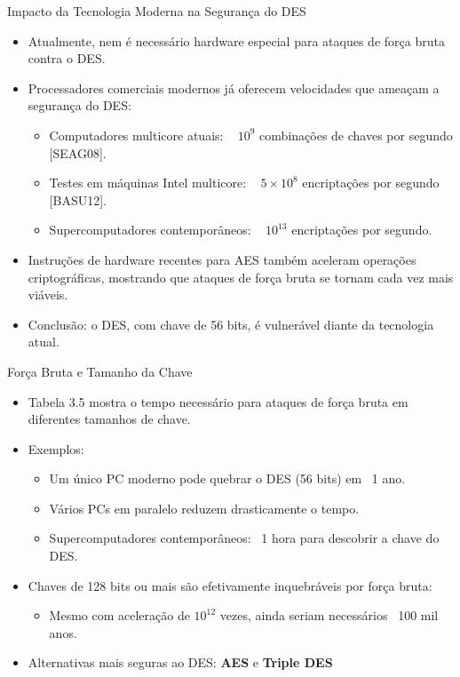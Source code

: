\begin{frame}{Impacto da Tecnologia Moderna na Segurança do DES}
    \begin{itemize}
        \item Atualmente, nem é necessário hardware especial para ataques de força bruta contra o DES.
        \item Processadores comerciais modernos já oferecem velocidades que ameaçam a segurança do DES:
        \begin{itemize}
            \item Computadores multicore atuais: ~ $10^9$ combinações de chaves por segundo [SEAG08].
            \item Testes em máquinas Intel multicore: ~ $5 \times 10^8$ encriptações por segundo [BASU12].
            \item Supercomputadores contemporâneos: ~ $10^{13}$ encriptações por segundo.
        \end{itemize}
        \item Instruções de hardware recentes para AES também aceleram operações criptográficas, mostrando que ataques de força bruta se tornam cada vez mais viáveis.
        \item Conclusão: o DES, com chave de 56 bits, é vulnerável diante da tecnologia atual.
    \end{itemize}
\end{frame}

\begin{frame}{Força Bruta e Tamanho da Chave}
    \begin{itemize}
        \item Tabela 3.5 mostra o tempo necessário para ataques de força bruta em diferentes tamanhos de chave.
        \item Exemplos:
        \begin{itemize}
            \item Um único PC moderno pode quebrar o DES (56 bits) em ~1 ano.
            \item Vários PCs em paralelo reduzem drasticamente o tempo.
            \item Supercomputadores contemporâneos: ~1 hora para descobrir a chave do DES.
        \end{itemize}
        \item Chaves de 128 bits ou mais são efetivamente inquebráveis por força bruta:
        \begin{itemize}
            \item Mesmo com aceleração de $10^{12}$ vezes, ainda seriam necessários ~100 mil anos.
        \end{itemize}
        \item Alternativas mais seguras ao DES: \textbf{AES} e \textbf{Triple DES}
    \end{itemize}
\end{frame}

